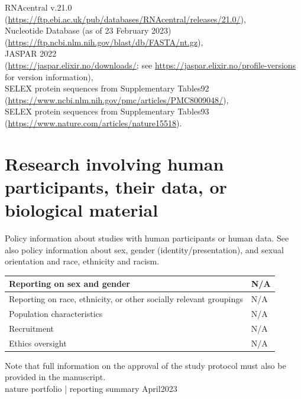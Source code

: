 \documentclass[10pt]{article}
\begin{document}
RNAcentral v.21.0\\
(\href{https://ftp.ebi.ac.uk/pub/databases/RNAcentral/releases/21.0/}{https://ftp.ebi.ac.uk/pub/databases/RNAcentral/releases/21.0/}),\\
Nucleotide Database (as of 23 February 2023)\\
(\href{https://ftp.ncbi.nlm.nih.gov/blast/db/FASTA/nt.gz}{https://ftp.ncbi.nlm.nih.gov/blast/db/FASTA/nt.gz}),\\
JASPAR 2022\\
(\href{https://jaspar.elixir.no/downloads/;}{https://jaspar.elixir.no/downloads/;} see \href{https://jaspar.elixir.no/profile-versions}{https://jaspar.elixir.no/profile-versions} for version information),\\
SELEX protein sequences from Supplementary Tables92\\
(\href{https://www.ncbi.nlm.nih.gov/pmc/articles/PMC8009048/}{https://www.ncbi.nlm.nih.gov/pmc/articles/PMC8009048/}),\\
SELEX protein sequences from Supplementary Tables93\\
(\href{https://www.nature.com/articles/nature15518}{https://www.nature.com/articles/nature15518}).

\section*{Research involving human participants, their data, or biological material}
Policy information about studies with human participants or human data. See also policy information about sex, gender (identity/presentation), and sexual orientation and race, ethnicity and racism.

\begin{center}
\begin{tabular}{|l|l|}
\hline
Reporting on sex and gender & N/A \\
\hline
Reporting on race, ethnicity, or other socially relevant groupings & N/A \\
\hline
Population characteristics & N/A \\
\hline
Recruitment & N/A \\
\hline
Ethics oversight & N/A \\
\hline
\end{tabular}
\end{center}

Note that full information on the approval of the study protocol must also be provided in the manuscript.\\
nature portfolio | reporting summary April2023
\end{document}
